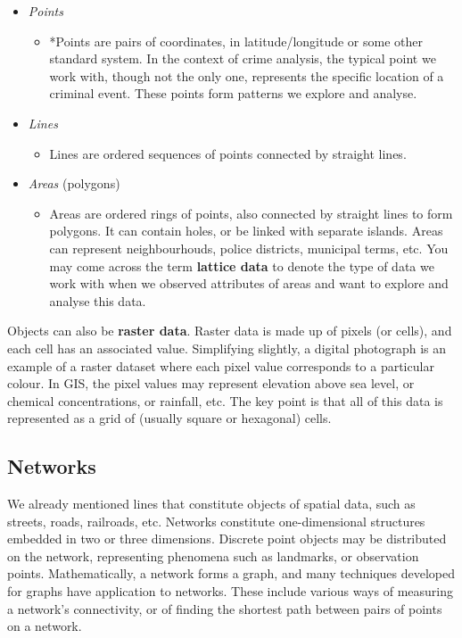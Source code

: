 \documentclass[
]{book}
\providecommand{\tightlist}{%
  \setlength{\itemsep}{0pt}\setlength{\parskip}{0pt}}
\begin{document}
\begin{itemize}
\tightlist
\item
  \emph{Points}

  \begin{itemize}
  \tightlist
  \item
    *Points are pairs of coordinates, in latitude/longitude or some other standard system. In the context of crime analysis, the typical point we work with, though not the only one, represents the specific location of a criminal event. These points form patterns we explore and analyse.
  \end{itemize}
\item
  \emph{Lines}

  \begin{itemize}
  \tightlist
  \item
    Lines are ordered sequences of points connected by straight lines.
  \end{itemize}
\item
  \emph{Areas} (polygons)

  \begin{itemize}
  \tightlist
  \item
    Areas are ordered rings of points, also connected by straight lines to form polygons. It can contain holes, or be linked with separate islands. Areas can represent neighbourhouds, police districts, municipal terms, etc. You may come across the term \textbf{lattice data} to denote the type of data we work with when we observed attributes of areas and want to explore and analyse this data.
  \end{itemize}
\end{itemize}

Objects can also be \textbf{raster data}. Raster data is made up of pixels (or cells), and each cell has an associated value. Simplifying slightly, a digital photograph is an example of a raster dataset where each pixel value corresponds to a particular colour. In GIS, the pixel values may represent elevation above sea level, or chemical concentrations, or rainfall, etc. The key point is that all of this data is represented as a grid of (usually square or hexagonal) cells.

\hypertarget{networks}{%
\subsection{Networks}\label{networks}}

We already mentioned lines that constitute objects of spatial data, such as streets, roads, railroads, etc. Networks constitute one-dimensional structures embedded in two or three dimensions. Discrete point objects may be distributed on the network, representing phenomena such as landmarks, or observation points. Mathematically, a network forms a graph, and many techniques developed for graphs have application to networks. These include various ways of measuring a network's connectivity, or of finding the shortest path between pairs of points on a network.
\end{document}

